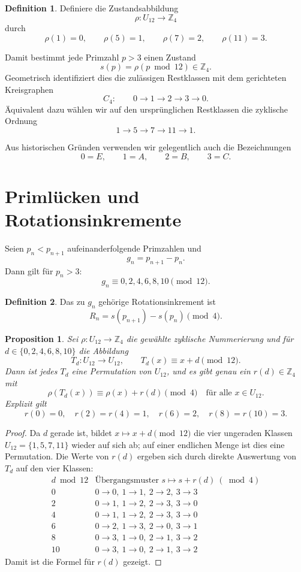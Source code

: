 \documentclass[11pt]{article}
\newtheorem{proposition}{Proposition}
\theoremstyle{definition}
\newtheorem{definition}{Definition}
\begin{document}
\begin{definition}
Definiere die Zustandsabbildung
\[
\rho:U_{12}\rightarrow \mathbb{Z}_4
\]
durch
\[
\rho(1)=0,\qquad
\rho(5)=1,\qquad
\rho(7)=2,\qquad
\rho(11)=3.
\]
\end{definition}

Damit bestimmt jede Primzahl $p>3$ einen Zustand
\[
s(p)=\rho(p\bmod 12)\in\mathbb{Z}_4.
\]
Geometrisch identifiziert dies die zul\"assigen Restklassen mit dem gerichteten Kreisgraphen
\[
C_4:\qquad 0\rightarrow1\rightarrow2\rightarrow3\rightarrow0.
\]
\"Aquivalent dazu w\"ahlen wir auf den urspr\"unglichen Restklassen die zyklische Ordnung
\[
1\to5\to7\to11\to1.
\]

Aus historischen Gr\"unden verwenden wir gelegentlich auch die Bezeichnungen
\[
0=E,\qquad 1=A,\qquad 2=B,\qquad 3=C.
\]

\section{Priml\"ucken und Rotationsinkremente}

Seien $p_n<p_{n+1}$ aufeinanderfolgende Primzahlen und
\[
g_n=p_{n+1}-p_n.
\]
Dann gilt f\"ur $p_n>3$:
\[
g_n\equiv 0,2,4,6,8,10 \pmod{12}.
\]

\begin{definition}
Das zu $g_n$ geh\"orige Rotationsinkrement ist
\[
R_n=s(p_{n+1})-s(p_n)\pmod 4.
\]
\end{definition}

\begin{proposition}
Sei $\rho:U_{12}\to\mathbb{Z}_4$ die gew\"ahlte zyklische Nummerierung und
f\"ur $d\in\{0,2,4,6,8,10\}$ die Abbildung
\[
T_d:U_{12}\to U_{12},\qquad T_d(x)\equiv x+d\pmod{12}.
\]
Dann ist jedes $T_d$ eine Permutation von $U_{12}$, und es gibt genau ein $r(d)\in\mathbb{Z}_4$ mit
\[
\rho(T_d(x))\equiv \rho(x)+r(d)\pmod 4
\quad\text{f\"ur alle }x\in U_{12}.
\]
Explizit gilt
\[
r(0)=0,\quad r(2)=r(4)=1,\quad r(6)=2,\quad r(8)=r(10)=3.
\]
\end{proposition}

\begin{proof}
Da $d$ gerade ist, bildet $x\mapsto x+d\pmod{12}$ die vier ungeraden Klassen
$U_{12}=\{1,5,7,11\}$ wieder auf sich ab; auf einer endlichen Menge ist dies eine Permutation.
Die Werte von $r(d)$ ergeben sich durch direkte Auswertung von $T_d$ auf den vier Klassen:
\[
\begin{array}{c|c}
d \bmod 12 & \text{\"Ubergangsmuster } s\mapsto s+r(d)\ (\bmod 4)\\
\hline
0   & 0\to0,\ 1\to1,\ 2\to2,\ 3\to3\\
2   & 0\to1,\ 1\to2,\ 2\to3,\ 3\to0\\
4   & 0\to1,\ 1\to2,\ 2\to3,\ 3\to0\\
6   & 0\to2,\ 1\to3,\ 2\to0,\ 3\to1\\
8   & 0\to3,\ 1\to0,\ 2\to1,\ 3\to2\\
10  & 0\to3,\ 1\to0,\ 2\to1,\ 3\to2
\end{array}
\]
Damit ist die Formel f\"ur $r(d)$ gezeigt.
\end{proof}
\end{document}

